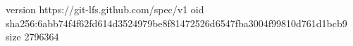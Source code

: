 version https://git-lfs.github.com/spec/v1
oid sha256:6abb74f4f62fd614d3524979be8f81472526d6547fba3004f99810d761d1bcb9
size 2796364

